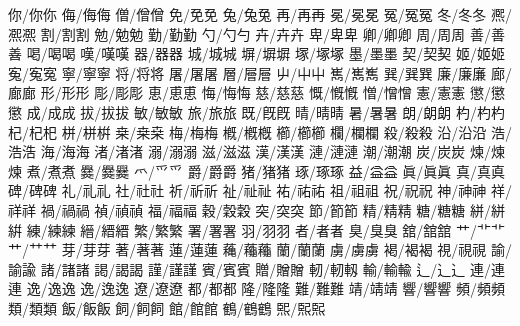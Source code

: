 你/你︀你 侮/侮︀侮 僧/僧︀僧 免/免︀免 兔/兔︀兔 再/再︀再 冕/冕︀冕 冤/冤︀冤 冬/冬︀冬 凞/凞︀凞 %
割/割︀割 勉/勉︀勉 勤/勤︀勤 勺/勺︁勺 卉/卉︀卉 卑/卑︀卑 卿/卿︂卿 周/周︀周 善/善︁善 喝/喝︀喝 %
嘆/嘆︀嘆 器/器︀器 城/城︀城 塀/塀︀塀 塚/塚︀塚 墨/墨︀墨 契/契︀契 姬/姬︀姬 寃/寃︀寃 寧/寧︀寧 %
将/将︀将 屠/屠︀屠 層/層︀層 屮/屮︀屮 嶲/嶲︀嶲 巽/巽︀巽 廉/廉︀廉 廊/廊︀廊 形/形︀形 彫/彫︀彫 %
恵/恵︀恵 悔/悔︀悔 慈/慈︀慈 慨/慨︀慨 憎/憎︀憎 憲/憲︀憲 懲/懲︀懲 成/成︀成 拔/拔︀拔 敏/敏︀敏 %
旅/旅︀旅 既/既︀既 晴/晴︀晴 暑/暑︀暑 朗/朗︀朗 杓/杓︀杓 杞/杞︀杞 栟/栟︀栟 桒/桒︀桒 梅/梅︀梅 %
槪/槪︀槪 櫛/櫛︀櫛 欄/欄︀欄 殺/殺︀殺 沿/沿︀沿 浩/浩︀浩 海/海︀海 渚/渚︀渚 溺/溺︀溺 滋/滋︁滋 %
漢/漢︀漢 漣/漣︀漣 潮/潮︀潮 炭/炭︀炭 煉/煉︀煉 煮/煮︀煮 爨/爨︀爨 爫/爫︀爫 爵/爵︁爵 猪/猪︀猪 %
琢/琢︀琢 益/益︀益 眞/眞︀眞 真/真︁真 碑/碑︀碑 礼/礼︀礼 社/社︀社 祈/祈︀祈 祉/祉︀祉 祐/祐︀祐 %
祖/祖︀祖 祝/祝︀祝 神/神︀神 祥/祥︀祥 禍/禍︀禍 禎/禎︀禎 福/福︀福 穀/穀︀穀 突/突︀突 節/節︀節 %
精/精︀精 糖/糖︀糖 絣/絣︀絣 練/練︁練 縉/縉︀縉 繁/繁︀繁 署/署︀署 羽/羽︀羽 者/者︀者 臭/臭︀臭 %
舘/舘︀舘 艹/艹︀艹 艹/艹︁艹 芽/芽︀芽 著/著︀著 蓮/蓮︀蓮 蘒/蘒︀蘒 蘭/蘭︀蘭 虜/虜︀虜 褐/褐︀褐 %
視/視︀視 諭/諭︁諭 諸/諸︀諸 謁/謁︀謁 謹/謹︀謹 賓/賓︀賓 贈/贈︀贈 軔/軔︀軔 輸/輸︁輸 辶/辶︀辶 %
連/連︀連 逸/逸︀逸 逸/逸︁逸 遼/遼︀遼 都/都︀都 隆/隆︀隆 難/難︀難 靖/靖︀靖 響/響︀響 頻/頻︀頻 %
類/類︀類 飯/飯︀飯 飼/飼︀飼 館/館︀館 鶴/鶴︀鶴 𤋮/𤋮︀𤋮 
